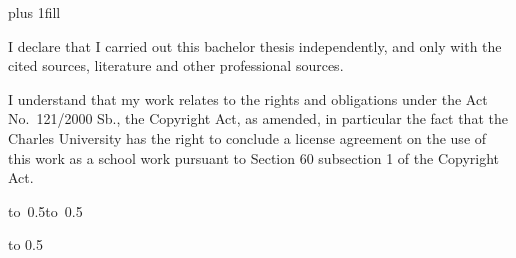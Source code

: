 \newpage



\openright
\hypersetup{pageanchor=true}
\pagestyle{plain}
\vglue 0pt plus 1fill

\noindent
I declare that I carried out this bachelor thesis independently, and only with the cited
sources, literature and other professional sources.

\medskip\noindent
I understand that my work relates to the rights and obligations under the Act No.~121/2000 Sb.,
the Copyright Act, as amended, in particular the fact that the Charles
University has the right to conclude a license agreement on the use of this
work as a school work pursuant to Section 60 subsection 1 of the Copyright Act.

\vspace{10mm}

\hbox{\hbox to 0.5\hbox to 0.5}

\vspace{20mm}
\newpage


\openright

\noindent
\Dedication

\newpage


\openright

\vbox to 0.5

\newpage

\openright
\pagestyle{plain}
\setcounter{page}{1}
